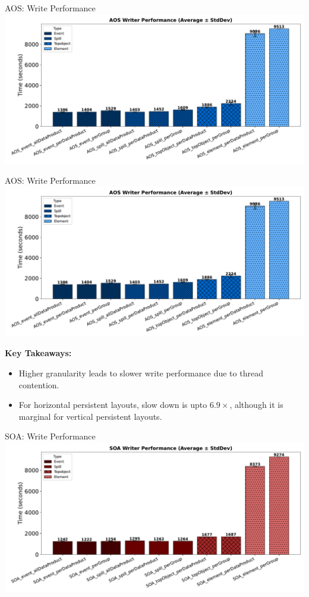\documentclass[aspectratio=169]{beamer}
\begin{document}
\begin{frame}{AOS: Write Performance}
  \centering
  \includegraphics[width=0.9\linewidth]{../experiments/Seaborn/AOSWriter_blue_shaded.pdf}
\end{frame}

\begin{frame}{AOS: Write Performance}
\centering
\includegraphics[width=0.5\linewidth]{../experiments/Seaborn/AOSWriter_blue_shaded.pdf}

\textbf{Key Takeaways:}
\begin{itemize}
\item Higher granularity leads to slower write performance due to thread contention.
\item For horizontal persistent layouts, slow down is upto $6.9\times$, although it is marginal for vertical persistent layouts.
\end{itemize}
\end{frame}

\begin{frame}{SOA: Write Performance}
\centering
\includegraphics[width=0.9\linewidth]{../experiments/Seaborn/SOAWriter_shaded.pdf}
\end{frame}
\end{document}
